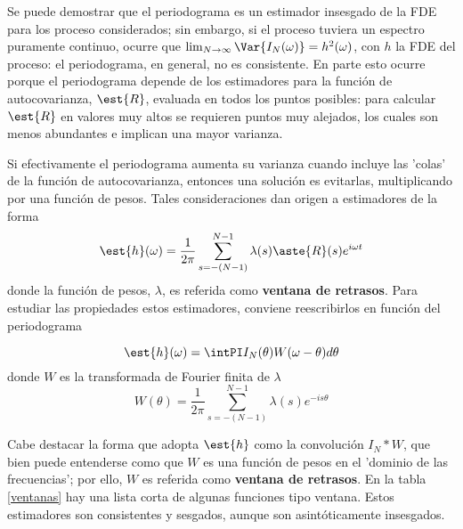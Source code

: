 Se puede demostrar que el periodograma es un estimador insesgado de la FDE para los proceso 
considerados; sin embargo, si el proceso tuviera un espectro puramente continuo, ocurre que 
$\lim_{N\rightarrow \infty} \Var{I_N(\omega)} = h^{2}(\omega)$, con $h$ la FDE del proceso: el 
periodograma, en general, no es consistente.
En parte esto ocurre porque el periodograma depende de los estimadores para la funci\'on de 
autocovarianza, $\est{R}$, evaluada en todos los puntos posibles: para calcular $\est{R}$ en 
valores muy altos se requieren puntos muy alejados, los cuales son menos abundantes e implican 
una mayor varianza.

Si efectivamente el periodograma aumenta su varianza cuando incluye las 'colas' de la funci\'on de 
autocovarianza, entonces una soluci\'on es evitarlas, multiplicando por una funci\'on de pesos. 
Tales consideraciones dan origen a estimadores de la forma
\begin{equation*}
\est{h}(\omega) = \frac{1}{2\pi} \sum_{s = -(N-1)}^{N-1} 
\lambda(s) \aste{R}(s) e^{i \omega t}
\label{ventaneando}
\end{equation*}
donde la funci\'on de pesos, $\lambda$, es referida como \textbf{ventana de retrasos}. Para 
estudiar las propiedades estos estimadores, conviene reescribirlos en funci\'on del periodograma

\begin{equation*}
\est{h}(\omega) = \intPI I_N(\theta) W(\omega-\theta) d\theta
\end{equation*}
donde $W$ es la transformada de Fourier finita de $\lambda$
\begin{equation*}
W(\theta) = \frac{1}{2\pi} \sum_{s = -(N-1)}^{N-1} \lambda(s) e^{-is\theta}
\end{equation*}

Cabe destacar la forma que adopta $\est{h}$ como la convoluci\'on $I_N \ast W$, que bien puede 
entenderse como que $W$ es una funci\'on de pesos en el 'dominio de las frecuencias'; por ello, $W$ 
es referida como \textbf{ventana de retrasos}.
En la tabla \ref{ventanas} hay una lista corta de algunas funciones tipo ventana. Estos estimadores 
son consistentes y sesgados, aunque son asint\'oticamente insesgados.

